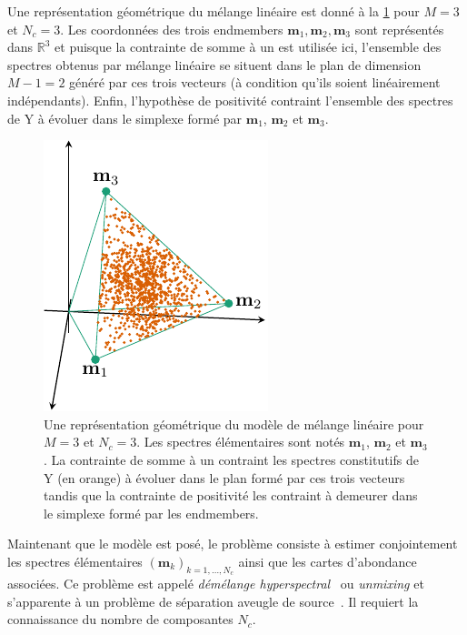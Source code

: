     Une représentation géométrique du mélange linéaire est donné à la \cref{fig-melange-lineaire} pour $M=3$ et $N_c=3$. Les coordonnées des trois endmembers $\mathbf{m}_1,\mathbf{m}_2,\mathbf{m}_3$ sont représentés dans $\mathbb{R}^3$ et puisque la contrainte de somme à un est utilisée ici, l'ensemble des spectres obtenus par mélange linéaire se situent dans le plan de dimension $M-1=2$ généré par ces trois vecteurs (à condition qu'ils soient linéairement indépendants). Enfin, l'hypothèse de positivité contraint l'ensemble des spectres de \gls{Y} à évoluer dans le simplexe formé par $\mathbf{m}_1$, $\mathbf{m}_2$ et $\mathbf{m}_3$.
    \begin{figure}
        \centering
        \includegraphics[]{img/chapitre1/figure17/melange_lineaire.pdf}
        \caption{Une représentation géométrique du modèle de mélange linéaire pour $M=3$ et $N_c=3$. Les spectres élémentaires sont notés $\mathbf{m}_1$, $\mathbf{m}_2$ et $\mathbf{m}_3$. La contrainte de somme à un contraint les spectres constitutifs de \gls{Y} (en orange) à évoluer dans le plan formé par ces trois vecteurs tandis que la contrainte de positivité les contraint à demeurer dans le simplexe formé par les endmembers.
            \protect\label{fig-melange-lineaire}}
    \end{figure}
    Maintenant que le modèle est posé, le problème consiste à estimer conjointement les spectres élémentaires $(\mathbf{m}_k)_{k=1,\dots,N_c}$ ainsi que les cartes d'abondance associées. Ce problème est appelé \emph{démélange hyperspectral}~\cite{bioucas2012hyperspectral, dobigeon2016linear} ou \emph{unmixing} et s'apparente à un problème de séparation aveugle de source~\cite{comon2010handbook}. Il requiert la connaissance du nombre de composantes $N_c$.
